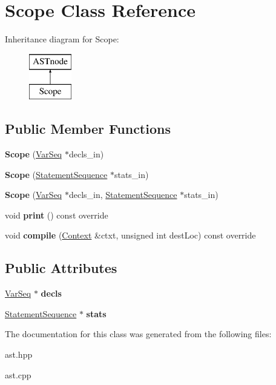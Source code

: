 \hypertarget{class_scope}{}\section{Scope Class Reference}
\label{class_scope}
Inheritance diagram for Scope\+:\begin{figure}[H]
\begin{center}
\leavevmode
\includegraphics[height=2.000000cm]{class_scope}
\end{center}
\end{figure}
\subsection*{Public Member Functions}
\begin{DoxyCompactItemize}
\item 
\mbox{\label{class_scope_a78f67e3251df41af3095bbf6b0716624}} 
{\bfseries Scope} (\hyperlink{class_var_seq}{Var\+Seq} $\ast$decls\+\_\+in)
\item 
\mbox{\label{class_scope_af2f563a3fd5083aa4f623960a3b26055}} 
{\bfseries Scope} (\hyperlink{class_statement_sequence}{Statement\+Sequence} $\ast$stats\+\_\+in)
\item 
\mbox{\label{class_scope_a3a7352ed3324dc4a3f2073eb70fa0b92}} 
{\bfseries Scope} (\hyperlink{class_var_seq}{Var\+Seq} $\ast$decls\+\_\+in, \hyperlink{class_statement_sequence}{Statement\+Sequence} $\ast$stats\+\_\+in)
\item 
\mbox{\label{class_scope_acf0c61b1ea1225a47975aa2ab3ed195d}} 
void {\bfseries print} () const override
\item 
\mbox{\label{class_scope_ab860a2c5e545bbc689aca48b8582971b}} 
void {\bfseries compile} (\hyperlink{class_context}{Context} \&ctxt, unsigned int dest\+Loc) const override
\end{DoxyCompactItemize}
\subsection*{Public Attributes}
\begin{DoxyCompactItemize}
\item 
\mbox{\label{class_scope_ad26ebfb097bd2407e12844ec97ec6dd3}} 
\hyperlink{class_var_seq}{Var\+Seq} $\ast$ {\bfseries decls}
\item 
\mbox{\label{class_scope_a7c881cb6c8283bd257b33d698ffd9a99}} 
\hyperlink{class_statement_sequence}{Statement\+Sequence} $\ast$ {\bfseries stats}
\end{DoxyCompactItemize}


The documentation for this class was generated from the following files\+:\begin{DoxyCompactItemize}
\item 
ast.\+hpp\item 
ast.\+cpp\end{DoxyCompactItemize}

